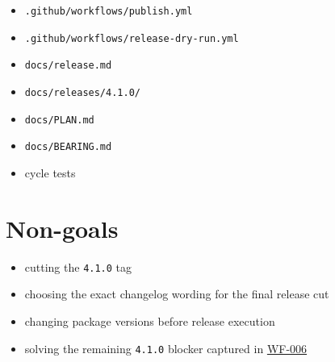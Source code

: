 \begin{itemize}
\tightlist
\item
  \texttt{.\allowbreak{}g\allowbreak{}i\allowbreak{}t\allowbreak{}h\allowbreak{}u\allowbreak{}b\allowbreak{}/\allowbreak{}w\allowbreak{}o\allowbreak{}r\allowbreak{}k\allowbreak{}f\allowbreak{}l\allowbreak{}o\allowbreak{}w\allowbreak{}s\allowbreak{}/\allowbreak{}p\allowbreak{}u\allowbreak{}b\allowbreak{}l\allowbreak{}i\allowbreak{}s\allowbreak{}h\allowbreak{}.\allowbreak{}y\allowbreak{}m\allowbreak{}l}
\item
  \texttt{.\allowbreak{}g\allowbreak{}i\allowbreak{}t\allowbreak{}h\allowbreak{}u\allowbreak{}b\allowbreak{}/\allowbreak{}w\allowbreak{}o\allowbreak{}r\allowbreak{}k\allowbreak{}f\allowbreak{}l\allowbreak{}o\allowbreak{}w\allowbreak{}s\allowbreak{}/\allowbreak{}r\allowbreak{}e\allowbreak{}l\allowbreak{}e\allowbreak{}a\allowbreak{}s\allowbreak{}e\allowbreak{}-\allowbreak{}d\allowbreak{}r\allowbreak{}y\allowbreak{}-\allowbreak{}r\allowbreak{}u\allowbreak{}n\allowbreak{}.\allowbreak{}y\allowbreak{}m\allowbreak{}l}
\item
  \texttt{d\allowbreak{}o\allowbreak{}c\allowbreak{}s\allowbreak{}/\allowbreak{}r\allowbreak{}e\allowbreak{}l\allowbreak{}e\allowbreak{}a\allowbreak{}s\allowbreak{}e\allowbreak{}.\allowbreak{}m\allowbreak{}d}
\item
  \texttt{d\allowbreak{}o\allowbreak{}c\allowbreak{}s\allowbreak{}/\allowbreak{}r\allowbreak{}e\allowbreak{}l\allowbreak{}e\allowbreak{}a\allowbreak{}s\allowbreak{}e\allowbreak{}s\allowbreak{}/\allowbreak{}4\allowbreak{}.\allowbreak{}1\allowbreak{}.\allowbreak{}0\allowbreak{}/}
\item
  \texttt{d\allowbreak{}o\allowbreak{}c\allowbreak{}s\allowbreak{}/\allowbreak{}P\allowbreak{}L\allowbreak{}A\allowbreak{}N\allowbreak{}.\allowbreak{}m\allowbreak{}d}
\item
  \texttt{d\allowbreak{}o\allowbreak{}c\allowbreak{}s\allowbreak{}/\allowbreak{}B\allowbreak{}E\allowbreak{}A\allowbreak{}R\allowbreak{}I\allowbreak{}N\allowbreak{}G\allowbreak{}.\allowbreak{}m\allowbreak{}d}
\item
  cycle tests
\end{itemize}

\section{Non-goals}\label{record-203-non-goals}

\begin{itemize}
\tightlist
\item
  cutting the \texttt{4\allowbreak{}.\allowbreak{}1\allowbreak{}.\allowbreak{}0} tag
\item
  choosing the exact changelog wording for the final release cut
\item
  changing package versions before release execution
\item
  solving the remaining \texttt{4\allowbreak{}.\allowbreak{}1\allowbreak{}.\allowbreak{}0} blocker captured in \href{https://github.com/flyingrobots/bijou/blob/cbd70612140e7a450d764b3c7be1c6af878b99bc/docs/design/WF-006-cut-clean-4-1-0-release-boundary.md}{WF-006}
\end{itemize}

